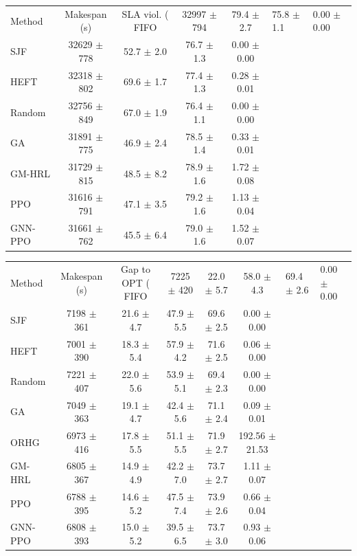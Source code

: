 \begin{tabular}{lcccc}
\toprule
Method & Makespan (s) & SLA viol. (%
\midrule
FIFO & 32997 $\pm$ 794 & 79.4 $\pm$ 2.7 & 75.8 $\pm$ 1.1 & 0.00 $\pm$ 0.00 \\
SJF & 32629 $\pm$ 778 & 52.7 $\pm$ 2.0 & 76.7 $\pm$ 1.3 & 0.00 $\pm$ 0.00 \\
HEFT & 32318 $\pm$ 802 & 69.6 $\pm$ 1.7 & 77.4 $\pm$ 1.3 & 0.28 $\pm$ 0.01 \\
Random & 32756 $\pm$ 849 & 67.0 $\pm$ 1.9 & 76.4 $\pm$ 1.1 & 0.00 $\pm$ 0.00 \\
GA & 31891 $\pm$ 775 & 46.9 $\pm$ 2.4 & 78.5 $\pm$ 1.4 & 0.33 $\pm$ 0.01 \\
GM-HRL & 31729 $\pm$ 815 & 48.5 $\pm$ 8.2 & 78.9 $\pm$ 1.6 & 1.72 $\pm$ 0.08 \\
PPO & 31616 $\pm$ 791 & 47.1 $\pm$ 3.5 & 79.2 $\pm$ 1.6 & 1.13 $\pm$ 0.04 \\
GNN-PPO & 31661 $\pm$ 762 & 45.5 $\pm$ 6.4 & 79.0 $\pm$ 1.6 & 1.52 $\pm$ 0.07 \\
\bottomrule
\end{tabular}

\begin{tabular}{lccccc}
\toprule
Method & Makespan (s) & Gap to OPT (%
\midrule
FIFO & 7225 $\pm$ 420 & 22.0 $\pm$ 5.7 & 58.0 $\pm$ 4.3 & 69.4 $\pm$ 2.6 & 0.00 $\pm$ 0.00 \\
SJF & 7198 $\pm$ 361 & 21.6 $\pm$ 4.7 & 47.9 $\pm$ 5.5 & 69.6 $\pm$ 2.5 & 0.00 $\pm$ 0.00 \\
HEFT & 7001 $\pm$ 390 & 18.3 $\pm$ 5.4 & 57.9 $\pm$ 4.2 & 71.6 $\pm$ 2.5 & 0.06 $\pm$ 0.00 \\
Random & 7221 $\pm$ 407 & 22.0 $\pm$ 5.6 & 53.9 $\pm$ 5.1 & 69.4 $\pm$ 2.3 & 0.00 $\pm$ 0.00 \\
GA & 7049 $\pm$ 363 & 19.1 $\pm$ 4.7 & 42.4 $\pm$ 5.6 & 71.1 $\pm$ 2.4 & 0.09 $\pm$ 0.01 \\
ORHG & 6973 $\pm$ 416 & 17.8 $\pm$ 5.5 & 51.1 $\pm$ 5.5 & 71.9 $\pm$ 2.7 & 192.56 $\pm$ 21.53 \\
GM-HRL & 6805 $\pm$ 367 & 14.9 $\pm$ 4.9 & 42.2 $\pm$ 7.0 & 73.7 $\pm$ 2.7 & 1.11 $\pm$ 0.07 \\
PPO & 6788 $\pm$ 395 & 14.6 $\pm$ 5.2 & 47.5 $\pm$ 7.4 & 73.9 $\pm$ 2.6 & 0.66 $\pm$ 0.04 \\
GNN-PPO & 6808 $\pm$ 393 & 15.0 $\pm$ 5.2 & 39.5 $\pm$ 6.5 & 73.7 $\pm$ 3.0 & 0.93 $\pm$ 0.06 \\
\bottomrule
\end{tabular}


